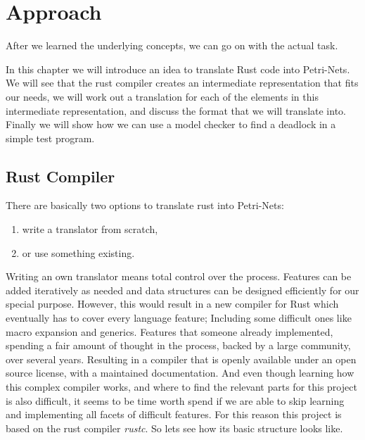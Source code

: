 \chapter{Approach}
\label{approach}
After we learned the underlying concepts, we can go on with the actual task.

In this chapter we will introduce an idea to translate Rust code into Petri-Nets.
We will see that the rust compiler creates an intermediate representation that fits our needs,
we will work out a translation for each of the elements in this intermediate representation,
and discuss the format that we will translate into.
Finally we will show how we can use a model checker to find a deadlock in a simple test program.

\section{Rust Compiler}
\label{app_rust}
There are basically two options to translate rust into Petri-Nets:
\begin{enumerate}
    \item write a translator from scratch,
    \item or use something existing.
\end{enumerate}
Writing an own translator means total control over the process.
Features can be added iteratively as needed and data structures can be designed efficiently for our special purpose.
However, this would result in a new compiler for Rust which eventually has to cover every language feature;
Including some difficult ones like macro expansion and generics.
Features that someone already implemented, spending a fair amount of thought in the process,
backed by a large community,
over several years.
Resulting in a compiler that is openly available under an open source license\cite{rustc}, with a maintained documentation\cite{rustc-guide}\cite{rustc-doc}.
And even though learning how this complex compiler works, and where to find the relevant parts for this project is also difficult, it seems to be time worth spend if we are able to skip learning and implementing all facets of difficult features.
For this reason this project is based on the rust compiler \textit{rustc}.
So lets see how its basic structure looks like.

